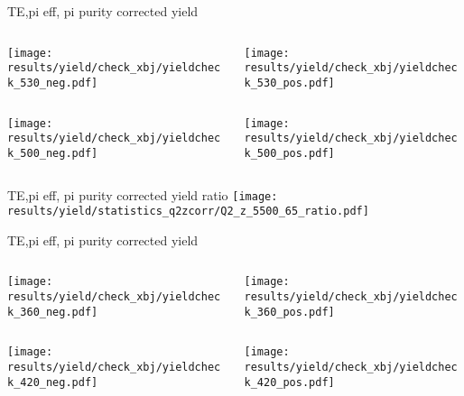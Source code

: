 \begin{frame}{TE,pi eff, pi purity corrected yield}
\begin{columns}
\begin{column}[T]{0.5\textwidth}
\texttt{[image: results/yield/check\_xbj/yieldcheck\_530\_neg.pdf]}
\end{column}
\begin{column}[T]{0.5\textwidth}
\texttt{[image: results/yield/check\_xbj/yieldcheck\_530\_pos.pdf]}
\end{column}
\end{columns}
\begin{columns}
\begin{column}[T]{0.5\textwidth}
\texttt{[image: results/yield/check\_xbj/yieldcheck\_500\_neg.pdf]}
\end{column}
\begin{column}[T]{0.5\textwidth}
\texttt{[image: results/yield/check\_xbj/yieldcheck\_500\_pos.pdf]}
\end{column}
\end{columns}
\end{frame}
\begin{frame}{TE,pi eff, pi purity corrected yield ratio}
\texttt{[image: results/yield/statistics\_q2zcorr/Q2\_z\_5500\_65\_ratio.pdf]}
\end{frame}
\begin{frame}{TE,pi eff, pi purity corrected yield}
\begin{columns}
\begin{column}[T]{0.5\textwidth}
\texttt{[image: results/yield/check\_xbj/yieldcheck\_360\_neg.pdf]}
\end{column}
\begin{column}[T]{0.5\textwidth}
\texttt{[image: results/yield/check\_xbj/yieldcheck\_360\_pos.pdf]}
\end{column}
\end{columns}
\begin{columns}
\begin{column}[T]{0.5\textwidth}
\texttt{[image: results/yield/check\_xbj/yieldcheck\_420\_neg.pdf]}
\end{column}
\begin{column}[T]{0.5\textwidth}
\texttt{[image: results/yield/check\_xbj/yieldcheck\_420\_pos.pdf]}
\end{column}
\end{columns}
\end{frame}
